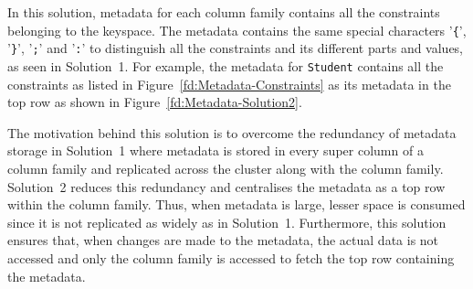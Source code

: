 In this solution, metadata  for each column family contains all the constraints
belonging to the keyspace. The metadata contains the same special characters
'\texttt{\{}',  '\texttt{\}}', '\texttt{;}' and '\texttt{:}' to distinguish all
the constraints and its different parts and values, as seen in
Solution~1. For example, the metadata for \texttt{Student}  contains
all the constraints as listed in Figure~\ref{fd:Metadata-Constraints} as its
metadata in the top row as shown in Figure~\ref{fd:Metadata-Solution2}.


% 
	
The motivation behind this solution is to overcome the redundancy of metadata
storage in Solution~1 where  metadata is stored in every super column
of a column family and replicated across the cluster along with the column
family.  Solution~2 reduces this redundancy and centralises the metadata as a top
row within the column family.  Thus,  when metadata is large, lesser space is
consumed since it is not replicated as widely as in Solution~1. 
Furthermore,  this solution  ensures that, when changes are made to the
metadata, the actual data is not accessed and only the
column family  is accessed to fetch the top row containing the metadata. 










